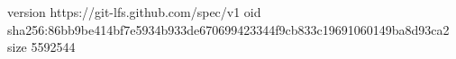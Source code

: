 version https://git-lfs.github.com/spec/v1
oid sha256:86bb9be414bf7e5934b933de670699423344f9cb833c19691060149ba8d93ca2
size 5592544
